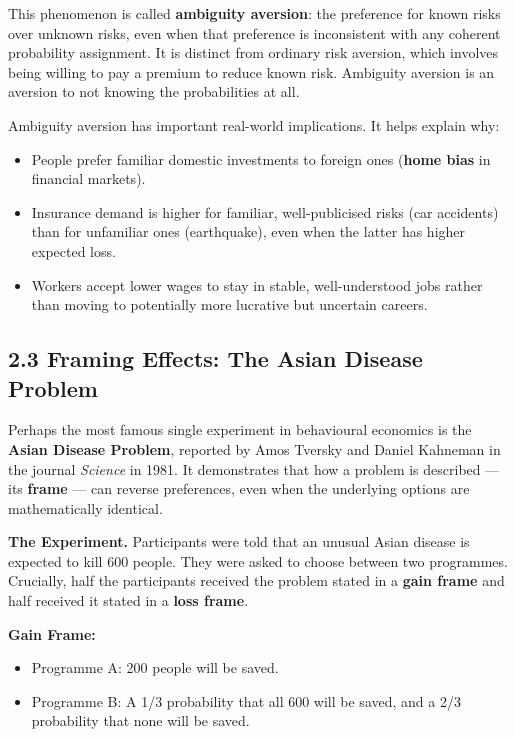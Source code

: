 \documentclass[12pt, letterpaper]{article}
\begin{document}
This phenomenon is called \textbf{ambiguity aversion}: the preference for known risks over unknown risks, even when that preference is inconsistent with any coherent probability assignment. It is distinct from ordinary risk aversion, which involves being willing to pay a premium to reduce known risk. Ambiguity aversion is an aversion to not knowing the probabilities at all.

Ambiguity aversion has important real-world implications. It helps explain why:
\begin{itemize}
\item People prefer familiar domestic investments to foreign ones (\textbf{home bias} in financial markets).
\item Insurance demand is higher for familiar, well-publicised risks (car accidents) than for unfamiliar ones (earthquake), even when the latter has higher expected loss.
\item Workers accept lower wages to stay in stable, well-understood jobs rather than moving to potentially more lucrative but uncertain careers.
\end{itemize}

\medskip


\subsection{2.3 Framing Effects: The Asian Disease Problem}


Perhaps the most famous single experiment in behavioural economics is the \textbf{Asian Disease Problem}, reported by Amos Tversky and Daniel Kahneman in the journal \textit{Science} in 1981. It demonstrates that how a problem is described --- its \textbf{frame} --- can reverse preferences, even when the underlying options are mathematically identical.

\textbf{The Experiment.} Participants were told that an unusual Asian disease is expected to kill 600 people. They were asked to choose between two programmes. Crucially, half the participants received the problem stated in a \textbf{gain frame} and half received it stated in a \textbf{loss frame}.

\textbf{Gain Frame:}
\begin{itemize}
\item Programme A: 200 people will be saved.
\item Programme B: A 1/3 probability that all 600 will be saved, and a 2/3 probability that none will be saved.
\end{itemize}
\end{document}
